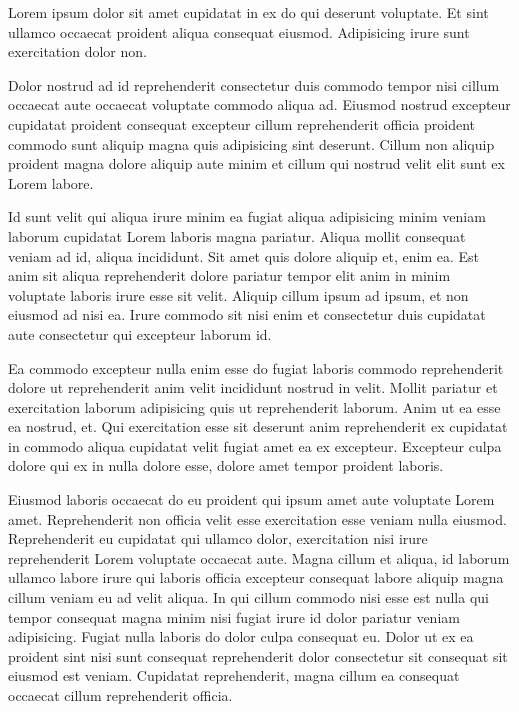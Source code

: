 \documentclass[12pt,a4j]{jarticle}
\begin{document}
Lorem ipsum dolor sit amet cupidatat in ex do qui deserunt voluptate. Et sint ullamco occaecat proident aliqua consequat eiusmod. Adipisicing irure sunt exercitation dolor non.

Dolor nostrud ad id reprehenderit consectetur duis commodo tempor nisi cillum occaecat aute occaecat voluptate commodo aliqua ad. Eiusmod nostrud excepteur cupidatat proident consequat excepteur cillum reprehenderit officia proident commodo sunt aliquip magna quis adipisicing sint deserunt. Cillum non aliquip proident magna dolore aliquip aute minim et cillum qui nostrud velit elit sunt ex Lorem labore.

Id sunt velit qui aliqua irure minim ea fugiat aliqua adipisicing minim veniam laborum cupidatat Lorem laboris magna pariatur. Aliqua mollit consequat veniam ad id, aliqua incididunt. Sit amet quis dolore aliquip et, enim ea. Est anim sit aliqua reprehenderit dolore pariatur tempor elit anim in minim voluptate laboris irure esse sit velit. Aliquip cillum ipsum ad ipsum, et non eiusmod ad nisi ea. Irure commodo sit nisi enim et consectetur duis cupidatat aute consectetur qui excepteur laborum id.

Ea commodo excepteur nulla enim esse do fugiat laboris commodo reprehenderit dolore ut reprehenderit anim velit incididunt nostrud in velit. Mollit pariatur et exercitation laborum adipisicing quis ut reprehenderit laborum. Anim ut ea esse ea nostrud, et. Qui exercitation esse sit deserunt anim reprehenderit ex cupidatat in commodo aliqua cupidatat velit fugiat amet ea ex excepteur. Excepteur culpa dolore qui ex in nulla dolore esse, dolore amet tempor proident laboris.

Eiusmod laboris occaecat do eu proident qui ipsum amet aute voluptate Lorem amet. Reprehenderit non officia velit esse exercitation esse veniam nulla eiusmod. Reprehenderit eu cupidatat qui ullamco dolor, exercitation nisi irure reprehenderit Lorem voluptate occaecat aute. Magna cillum et aliqua, id laborum ullamco labore irure qui laboris officia excepteur consequat labore aliquip magna cillum veniam eu ad velit aliqua. In qui cillum commodo nisi esse est nulla qui tempor consequat magna minim nisi fugiat irure id dolor pariatur veniam adipisicing. Fugiat nulla laboris do dolor culpa consequat eu. Dolor ut ex ea proident sint nisi sunt consequat reprehenderit dolor consectetur sit consequat sit eiusmod est veniam. Cupidatat reprehenderit, magna cillum ea consequat occaecat cillum reprehenderit officia.
\end{document}

